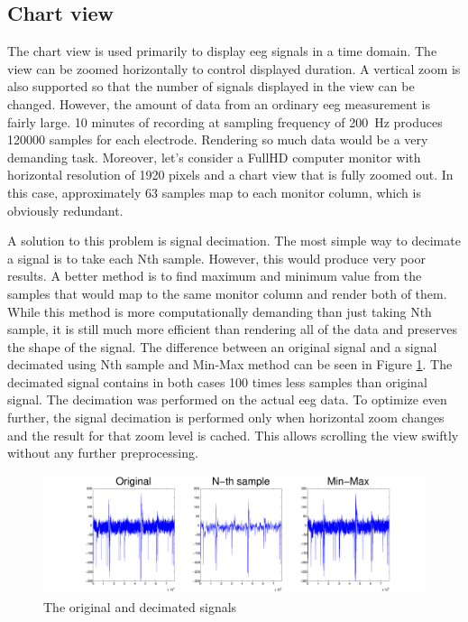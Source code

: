 \subsection{Chart view}
\label{ssec:ChartView}
The chart view is used primarily to display \gls{eeg} signals in a time domain. The view can be zoomed horizontally to control displayed duration. A vertical zoom is also supported so that the number of signals displayed in the view can be changed. However, the amount of data from an ordinary \gls{eeg} measurement is fairly large. 10 minutes of recording at sampling frequency of \SI{200}{\Hz} produces 120000 samples for each electrode. Rendering so much data would be a very demanding task. Moreover, let's consider a FullHD computer monitor with horizontal resolution of 1920 pixels and a chart view that is fully zoomed out. In this case, approximately 63 samples map to each monitor column, which is obviously redundant.

A solution to this problem is signal decimation. The most simple way to decimate a signal is to take each Nth sample. However, this would produce very poor results. A better method is to find maximum and minimum value from the samples that would map to the same monitor column and render both of them. While this method is more computationally demanding than just taking Nth sample, it is still much more efficient than rendering all of the data and preserves the shape of the signal. The difference between an original signal and a signal decimated using Nth sample and Min-Max method can be seen in Figure \ref{fig:SignalDecimation}. The decimated signal contains in both cases 100 times less samples than original signal. The decimation was performed on the actual \gls{eeg} data. To optimize even further, the signal decimation is performed only when horizontal zoom changes and the result for that zoom level is cached. This allows scrolling the view swiftly without any further preprocessing.

\begin{figure}[htb]
	\centering
	\includegraphics[width=1\linewidth]{fig/signalDec.pdf}
	\caption{The original and decimated signals}
	\label{fig:SignalDecimation}
\end{figure}


